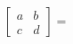 \documentclass[preview]{standalone}
\begin{document}
\begin{align*}
\begin{bmatrix} a & b \\ c & d \end{bmatrix} =
\end{align*}
\end{document}
